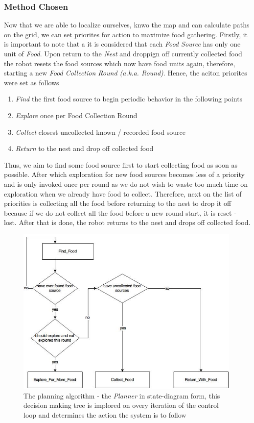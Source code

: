 \documentclass[11pt, a4paper]{article}
\begin{document}
\subsubsection{Method Chosen}
\label{Planner_Principle}

Now that we are able to localize ourselves, knwo the map and can calculate paths on the grid, we can set priorites for action to maximize food gathering. Firstly, it is important to note that a it is considered that each \textit{Food Source} has only one unit of \textit{Food}. Upon return to the \textit{Nest} and droppign off currently collected food the robot resets the food sources which now have food units again, therefore, starting a new \textit{Food Collection Round (a.k.a. Round)}. Hence, the aciton priorites were set as follows

\begin{enumerate}
	\item \textit{Find} the first food source to begin periodic behavior in the following points
	\item \textit{Explore} once per Food Collection Round
	\item \textit{Collect} closest uncollected known / recorded food source
	\item \textit{Return} to the nest and drop off collected food
\end{enumerate}

Thus, we aim to find some food source first to start collecting food as soon as possible. After which exploration for new food sources becomes less of a priority and is only invoked once per round as we do not wish to waste too much time on exploration when we already have food to collect. Therefore, next on the list of priorities is collecting all the food before returning to the nest to drop it off because if we do not collect all the food before a new round start, it is reset - lost. After that is done, the robot returns to the nest and drops off collected food.


\begin{figure}[H]
	  \centering
	  \includegraphics[width=30em]{../assets/fig_planner.jpg}
          \caption{The planning algorithm - the \textit{Planner} in state-diagram form, this decision making tree is implored on overy iteration of the control loop and determines the action the system is to follow}
\end{figure} 
\end{document}
